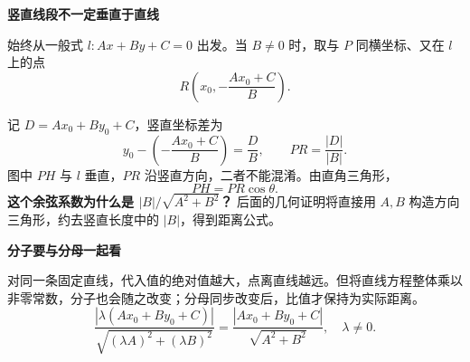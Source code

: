 \begin{explanationbox}
\begin{minipage}{\linewidth}
\textbf{\textcolor{CExplanation}{竖直线段不一定垂直于直线}}

始终从一般式 $l:Ax+By+C=0$ 出发。当 $B\ne0$ 时，取与 $P$ 同横坐标、又在 $l$ 上的点
\[
 R\left(x_0,-\frac{Ax_0+C}{B}\right).
\]

\end{minipage}

记 $D=Ax_0+By_0+C$，竖直坐标差为
\[
 y_0-\left(-\frac{Ax_0+C}{B}\right)=\frac{D}{B},
 \qquad PR=\frac{|D|}{|B|}.
\]
图中 $PH$ 与 $l$ 垂直，$PR$ 沿竖直方向，二者不能混淆。由直角三角形，
\[
 PH=PR\cos\theta.
\]
\textbf{这个余弦系数为什么是 $|B|/\sqrt{A^2+B^2}$？} 后面的几何证明将直接用 $A,B$ 构造方向三角形，约去竖直长度中的 $|B|$，得到距离公式。

\medskip
\textbf{\textcolor{CExplanation}{分子要与分母一起看}}

对同一条固定直线，代入值的绝对值越大，点离直线越远。但将直线方程整体乘以非零常数，分子也会随之改变；分母同步改变后，比值才保持为实际距离。
\[
 \frac{|\lambda(Ax_0+By_0+C)|}{\sqrt{(\lambda A)^2+(\lambda B)^2}}
 =\frac{|Ax_0+By_0+C|}{\sqrt{A^2+B^2}},\quad \lambda\ne0.
\]
\end{explanationbox}
